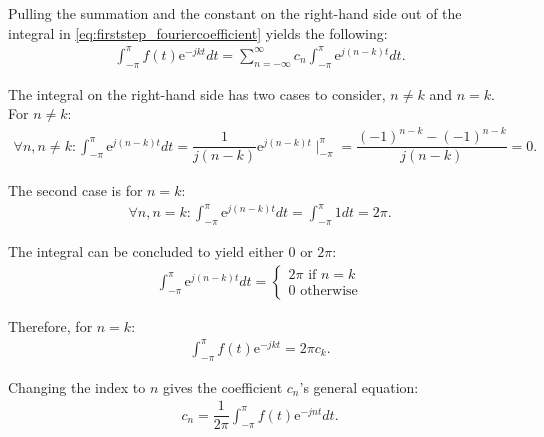 Pulling the summation and the constant on the right-hand side out of the integral in \eqref{eq:firststep_fouriercoefficient} yields the following:
\begin{align*}
\int_{-\pi}^\pi f(t) \text{e}^{-j k t}dt = \sum_{n=-\infty}^\infty c_n \int_{-\pi}^\pi \text{e}^{j (n-k) t}dt.
\end{align*}

The integral on the right-hand side has two cases to consider, $n \neq k$ and $n = k$. For $n\neq k$:
\begin{align*}
	\forall n,n\neq k: \int_{-\pi}^\pi \text{e}^{j(n-k)t}dt 
	=\dfrac{1}{j(n-k)}\text{e}^{j(n-k)t}\mid_{-\pi}^{\pi}
	=\dfrac{(-1)^{n-k}-(-1)^{n-k}}{j(n-k)}
	=0.
\end{align*}

The second case is for $n = k$:
\begin{align*}
\forall n,n=k: \int_{-\pi}^\pi \text{e}^{j(n-k)t}dt = \int_{-\pi}^\pi 1 dt = 2\pi.
\end{align*}

The integral can be concluded to yield either $0$ or $2\pi$:
\begin{align}
	\int_{-\pi}^{\pi} \text{e}^{j (n-k)t}dt 
	= 
	\begin{cases}
			2\pi \text{ if } n=k\\
			0 \text{ otherwise}
	\end{cases}
\end{align}

Therefore, for $n = k$:
\begin{align*}
\int_{-\pi}^\pi f(t)\text{e}^{-j k t} = 2\pi c_k.
\end{align*}

Changing the index to $n$ gives the coefficient $c_n$'s general equation:
\begin{align*}
	c_n = \dfrac{1}{2\pi} \int_{-\pi}^{\pi} f(t) \text{e}^{-j n t}dt.
\end{align*}

